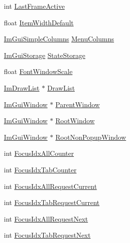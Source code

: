 \begin{DoxyCompactItemize}
\item 
int \mbox{\hyperlink{struct_im_gui_window_a6f3c194efabb4fd0a99be45fa5fe26f1}{Last\+Frame\+Active}}
\item 
float \mbox{\hyperlink{struct_im_gui_window_a5e6be361ee0c71a22a1ff68f6dbf09ff}{Item\+Width\+Default}}
\item 
\mbox{\hyperlink{struct_im_gui_simple_columns}{Im\+Gui\+Simple\+Columns}} \mbox{\hyperlink{struct_im_gui_window_a9207bb87da58863ce60c08679ef19977}{Menu\+Columns}}
\item 
\mbox{\hyperlink{struct_im_gui_storage}{Im\+Gui\+Storage}} \mbox{\hyperlink{struct_im_gui_window_a2151ab67f2624bd606883ad346179486}{State\+Storage}}
\item 
float \mbox{\hyperlink{struct_im_gui_window_a566ce9268a466afbbec78532d5cfa3c9}{Font\+Window\+Scale}}
\item 
\mbox{\hyperlink{struct_im_draw_list}{Im\+Draw\+List}} $\ast$ \mbox{\hyperlink{struct_im_gui_window_a39de4668b09754136c6fd7ab89ab674a}{Draw\+List}}
\item 
\mbox{\hyperlink{struct_im_gui_window}{Im\+Gui\+Window}} $\ast$ \mbox{\hyperlink{struct_im_gui_window_a5f0b37cb12fbeb3efe00d0cd826d5d65}{Parent\+Window}}
\item 
\mbox{\hyperlink{struct_im_gui_window}{Im\+Gui\+Window}} $\ast$ \mbox{\hyperlink{struct_im_gui_window_aef9281297b0993c8f1b7c1ff7987cb61}{Root\+Window}}
\item 
\mbox{\hyperlink{struct_im_gui_window}{Im\+Gui\+Window}} $\ast$ \mbox{\hyperlink{struct_im_gui_window_a43b1e2ffa15d572f4d0ce4fbbeb5595f}{Root\+Non\+Popup\+Window}}
\item 
int \mbox{\hyperlink{struct_im_gui_window_a51ee526aed5b993e0a849f2db1fdc4dc}{Focus\+Idx\+All\+Counter}}
\item 
int \mbox{\hyperlink{struct_im_gui_window_a7e3e75ec3d66d04801bfffdd02643d3c}{Focus\+Idx\+Tab\+Counter}}
\item 
int \mbox{\hyperlink{struct_im_gui_window_adfbeeeaa2eebd054ec0cd99dccb34f2f}{Focus\+Idx\+All\+Request\+Current}}
\item 
int \mbox{\hyperlink{struct_im_gui_window_a71c9ea6561a07160e5ce552db1d64b0b}{Focus\+Idx\+Tab\+Request\+Current}}
\item 
int \mbox{\hyperlink{struct_im_gui_window_a152487f402088ce413bb6c215b308c34}{Focus\+Idx\+All\+Request\+Next}}
\item 
int \mbox{\hyperlink{struct_im_gui_window_af7e93a1027da314fe73b64d97bfa73be}{Focus\+Idx\+Tab\+Request\+Next}}
\end{DoxyCompactItemize}


